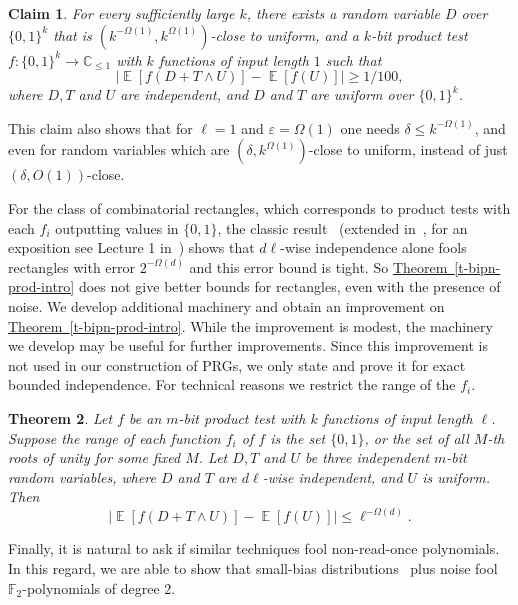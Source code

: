 \documentclass[11pt]{article}
\numberwithin{equation}{section}
\newtheorem{theorem}{Theorem}[section]
\newtheorem{claim}[theorem]{Claim}
\theoremstyle{definition}
\theoremstyle{plain}
\newcommand{\C}{\mathbb C}
\newcommand{\expref}[2]{\hyperref[#2]{#1~\ref{#2}}}
\newcommand{\zo}{\{0,1\}}
\def\eps{\varepsilon}
\def\Blocklength{\ell}
\newcommand\F{\mathbb F}
\DeclareMathOperator*{\E}{\mathbb{E}}                 %
\begin{document}
\begin{claim} \label{claim-counterexample}
For every sufficiently large $k$, there exists a random variable $D$ over
$\zo^k$ that is $(k^{-\Omega(1)}, k^{\Omega(1)})$-close to uniform, and a 
$k$-bit %
product test $f\colon \zo^{k} \to \C_{\le 1}$ with
$k$ functions of input length $1$ such that
  \[
    \big| \E[f(D + T \wedge U)] - \E[f(U)] \big| \ge 1/100 ,
  \]
  where $D,T$ and $U$ are independent, and $D$ and $T$ are uniform over $\zo^k$. %
%
\end{claim}

This claim also shows that for $\Blocklength = 1$ and $\eps = \Omega(1)$ one needs
$\delta \le k^{-\Omega(1)}$, and even for random variables which are $(\delta,
k^{\Omega(1)})$-close to uniform, instead of just $(\delta, O(1))$-close.

For the class of combinatorial rectangles, which corresponds to product tests with each $f_i$ outputting values in $\{0, 1\}$, 
the classic result~\cite{EvenGLNV98} (extended in~\cite{ChariRS00}, for an exposition see Lecture 1 in~\cite{viola-special-topics17}) 
shows that $d\Blocklength$-wise independence alone fools rectangles with error $2^{-\Omega(d)}$ and this error bound is tight.
So \expref{Theorem}{t-bipn-prod-intro} does not give better bounds for rectangles, even with the presence of noise.
We develop additional machinery and obtain an improvement on \expref{Theorem}{t-bipn-prod-intro}.
While the improvement is modest, the machinery we develop may be useful for further improvements.
Since this improvement is not used in our construction of PRGs, we only state
and prove it for exact bounded independence.
For technical reasons we restrict the range of the $f_i$.



\begin{theorem} \label{thm:bipnfp-strong}
  Let $f$ be an %
  $m$-bit %
  product test with $k$ functions of input length $\Blocklength$.
  Suppose the range of each function $f_i$ of $f$ is the set $\zo$, or the set of all $M$-th roots of unity for some fixed $M$.
  Let $D,T$ and $U$ be three independent $m$-bit random variables,  %
  where $D$ and $T$ are $d\Blocklength$-wise independent, and $U$ is uniform.  %
  Then
  \[
    \bigl| \E[ f(D + T \wedge U) ] - \E[ f(U) ] \bigr| \le \Blocklength^{-\Omega(d)} .
  \]
\end{theorem}


%

Finally, it is natural to ask if similar techniques fool non-read-once
polynomials.
In this regard, we are able to show that small-bias 
distributions~\cite{NaorN93} plus noise fool $\F_2$-polynomials of degree $2$.
\end{document}
